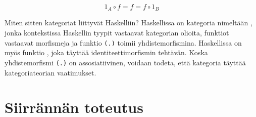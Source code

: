 \documentclass[finnish]{tktltiki2}
\begin{document}
$$ 1_A \circ f = f = f \circ 1_B $$

Miten sitten kategoriat liittyvät Haskelliin? Haskellissa on kategoria nimeltään , jonka
kontekstissa Haskellin tyypit vastaavat kategorian olioita, funktiot vastaavat morfismeja ja funktio
\verb|(.)| toimii yhdistemorfismina. Haskellissa on myös funktio , joka täyttää
identiteettimorfismin tehtävän. Koska yhdistemorfismi \verb|(.)| on assosiatiivinen, voidaan todeta,
että kategoria  täyttää kategoriateorian vaatimukset.





\section{Siirrännän toteutus}



%
%
\end{document}
